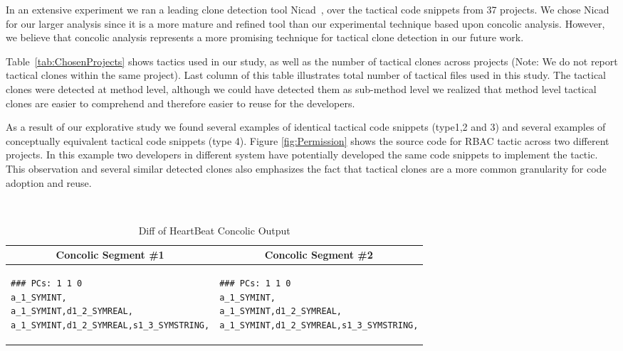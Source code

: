 In an extensive experiment we ran a leading clone detection tool Nicad~\cite{Roy:2008:NAD:1437898.1438600}, over the tactical code snippets from 37 projects. We chose Nicad for our larger analysis since it is a more mature and refined tool than our experimental technique based upon concolic analysis. However, we believe that concolic analysis represents a more promising technique for tactical clone detection in our future work.




Table~\ref{tab:ChosenProjects} shows tactics used in our study, as well as the number of tactical clones across projects (Note: We do not report tactical clones within the same project). Last column of this table illustrates total number of tactical files used in this study. The tactical clones were detected at method level, although we could have detected them as sub-method level we realized that method level tactical clones are easier to comprehend and therefore easier to reuse for the developers. 


As a result of our explorative study we found several examples of identical tactical code snippets (type1,2 and 3) and several examples of conceptually equivalent tactical code snippets (type 4). Figure \ref{fig:Permission} shows the source code for RBAC tactic across two different projects. In this example two developers in different system have potentially developed the same code snippets to implement the tactic. This observation and several similar detected clones also emphasizes the fact that tactical clones are a more common granularity for code adoption and reuse.



\noindent
\begin{table}[hb] %
\vspace{-16pt}
\caption{Diff of HeartBeat Concolic Output}
~\label{table:concolicoutputcomparision}
\centering
\begin{tabular}{ p{3.8cm} | p{3.8cm} }
\multicolumn{1}{c}{\textbf{Concolic Segment \#1}} & \multicolumn{1}{c}{\textbf{Concolic Segment \#2}} \\ \hline \hline
\begin{lstlisting}[style=ConcolicOutput]
### PCs: 1 1 0
a_1_SYMINT,
a_1_SYMINT,d1_2_SYMREAL,
a_1_SYMINT,d1_2_SYMREAL,s1_3_SYMSTRING,
\end{lstlisting}
&
\begin{lstlisting}[style=ConcolicOutput]
### PCs: 1 1 0
a_1_SYMINT,
a_1_SYMINT,d1_2_SYMREAL,
a_1_SYMINT,d1_2_SYMREAL,s1_3_SYMSTRING,
\end{lstlisting}

\end{tabular}
\label{fig:exampleoutput}
\vspace{-10pt}
\end{table}

